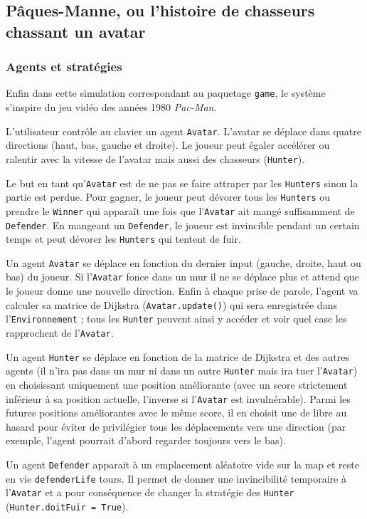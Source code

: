 \documentclass[a4paper]{article}
\begin{document}
\subsection{Pâques-Manne, ou l'histoire de chasseurs chassant un avatar}
\subsubsection{Agents et stratégies}
Enfin dans cette simulation correspondant au paquetage \texttt{game}, le système s'inspire du jeu vidéo des années 1980 \textit{Pac-Man}. 

\medskip
L'utilisateur contrôle au clavier un agent \texttt{Avatar}. L'avatar se déplace dans quatre directions (haut, bas, gauche et droite). Le joueur peut égaler accélérer ou ralentir avec la vitesse de l'avatar mais aussi des chasseurs (\texttt{Hunter}).

\medskip
Le but en tant qu'\texttt{Avatar} est de ne pas se faire attraper par les \texttt{Hunters} sinon la partie est perdue. Pour gagner, le joueur peut dévorer tous les \texttt{Hunters} ou prendre le \texttt{Winner} qui apparaît une fois que l'\texttt{Avatar} ait mangé suffisamment de \texttt{Defender}. En mangeant un \texttt{Defender}, le joueur est invincible pendant un certain temps et peut dévorer les \texttt{Hunters} qui tentent de fuir.

\medskip
Un agent \texttt{Avatar} se déplace en fonction du dernier input (gauche, droite, haut ou bas) du joueur. Si l'\texttt{Avatar} fonce dans un mur il ne se déplace plus et attend que le joueur donne une nouvelle direction. Enfin à chaque prise de parole, l'agent va calculer sa matrice de Dijkstra (\texttt{Avatar.update()}) qui sera enregistrée dans l'\texttt{Environnement} ; tous les \texttt{Hunter} peuvent ainsi y accéder et voir quel case les rapprochent de l'\texttt{Avatar}.

\medskip
Un agent \texttt{Hunter} se déplace en fonction de la matrice de Dijkstra et des autres agents (il n'ira pas dans un mur ni dans un autre \texttt{Hunter} mais ira tuer l'\texttt{Avatar}) en choisissant uniquement une position améliorante (avec un score strictement inférieur à sa position actuelle, l'inverse si l'\texttt{Avatar} est invulnérable). Parmi les futures positions améliorantes avec le même score, il en choisit une de libre au hasard pour éviter de privilégier tous les déplacements vers une direction (par exemple, l'agent pourrait d'abord regarder toujours vers le bas).

\medskip
Un agent \texttt{Defender} apparait à un emplacement aléatoire vide sur la map et reste en vie \texttt{defenderLife} tours. Il permet de donner une invincibilité temporaire à l'\texttt{Avatar} et a pour conséquence de changer la stratégie des \texttt{Hunter} (\texttt{Hunter.doitFuir = True}).
\end{document}
